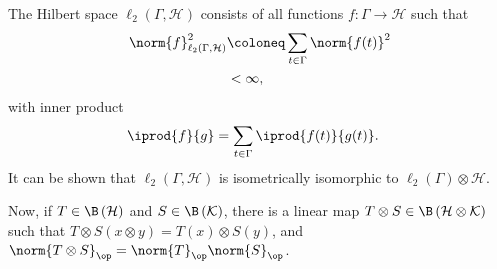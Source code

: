 The Hilbert space $\ell_2\left( \Gamma,\mathcal{H} \right)$ consists of all functions $f\colon \Gamma\rightarrow \mathcal{H}$ such that
\begin{align*}
  \norm{f}_{\ell_2\left( \Gamma,\mathcal{H} \right)}^2 &\coloneq \sum_{t\in\Gamma}\norm{f(t)}^2\\
                                                       &< \infty,
\end{align*}
with inner product
\begin{align*}
  \iprod{f}{g} &= \sum_{t\in\Gamma} \iprod{f(t)}{g(t)}.
\end{align*}
It can be shown that $\ell_2\left( \Gamma,\mathcal{H} \right)$ is isometrically isomorphic to $\ell_2\left( \Gamma \right)\otimes \mathcal{H}$.\newline

Now, if $T\in \B\left( \mathcal{H} \right)$ and $S\in \B\left( \mathcal{K} \right)$, there is a linear map $T\otimes S\in \B\left( \mathcal{H}\otimes \mathcal{K} \right)$ such that $T\otimes S \left( x\otimes y \right) = T(x)\otimes S(y)$, and $\norm{T\otimes S}_{\op} = \norm{T}_{\op}\norm{S}_{\op}$.\newline

